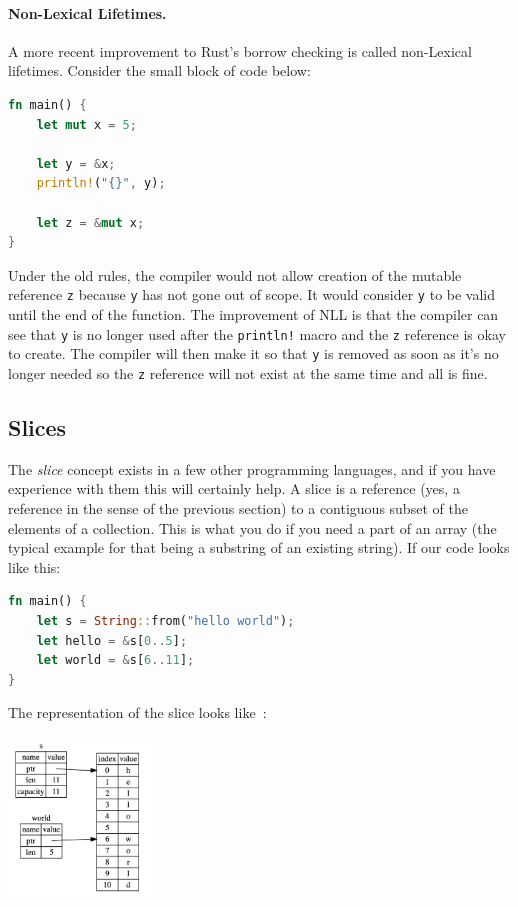 \documentclass[a4paper]{report}
\begin{document}
\paragraph{Non-Lexical Lifetimes.} A more recent improvement to Rust's borrow checking is called non-Lexical lifetimes. Consider the small block of code below:
\begin{lstlisting}[language=Rust]
fn main() {
    let mut x = 5;

    let y = &x;
    println!("{}", y);

    let z = &mut x;
}
\end{lstlisting}

Under the old rules, the compiler would not allow creation of the mutable reference \texttt{z} because \texttt{y} has not gone out of scope. It would consider \texttt{y} to be valid until the end of the function. The improvement of NLL is that the compiler can see that \texttt{y} is no longer used after the \texttt{println!} macro and the \texttt{z} reference is okay to create. The compiler will then make it so that \texttt{y} is removed as soon as it's no longer needed so the \texttt{z} reference will not exist at the same time and all is fine.

\subsection*{Slices}
The \textit{slice} concept exists in a few other programming languages, and if you have experience with them this will certainly help. A slice is a reference (yes, a reference in the sense of the previous section) to a contiguous subset of the elements of a collection. This is what you do if you need a part of an array (the typical example for that being a substring of an existing string). If our code looks like this:

\begin{lstlisting}[language=Rust]
fn main() {
    let s = String::from("hello world");
    let hello = &s[0..5];
    let world = &s[6..11];
}
\end{lstlisting}

The representation of the slice looks like~\cite{rustdocs}:
\begin{center}
	\includegraphics[width=0.3\textwidth]{images/string-slice.png}
\end{center}
\end{document}
